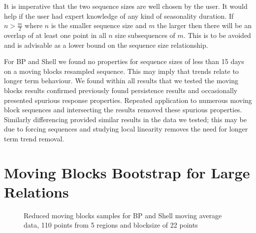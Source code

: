 It is imperative that the two sequence sizes are well chosen by the
user. It would help if the user had expert knowledge of any kind of
seasonality duration. If $n > \frac{m}{2}$ where $n$ is the
smaller sequence size and $m$ the larger then there will be an overlap
of at least one point in all $n$ size subsequences of $m$. This is to
be avoided and is advisable as a lower bound on the sequence size
relationship. 

\smallskip

 For BP and Shell we found no properties for sequence
sizes of less than 15 days on a moving blocks resampled sequence. This
may imply that trends relate to longer term behaviour.
We
found within all results that we tested the moving blocks results
confirmed previously found persistence results and occasionally
presented spurious response properties. Repeated application to
numerous moving block sequences and intersecting the results removed
these spurious properties. Similarly differencing provided similar
results in the data we tested; this may be due to forcing sequences
and studying local linearity removes the need for longer term trend
removal.


\section{Moving Blocks Bootstrap for Large Relations}



\begin{figure}
\begin{minipage}{7cm}
\centerline{}
\caption{\label{graph:bp_11mnfixblock1}{Reduced moving blocks
samples for BP and Shell moving average data, 78 points from 11
regions and blocksize of 7 points}}
\end{minipage}
\hfill
\begin{minipage}{7cm}
\centerline{}
\caption{\label{graph:bp_11mnfixblock2}{Reduced moving blocks
samples for BP and Shell moving average data, 110 points from 5
regions and blocksize of 22 points}}
\end{minipage}
\end{figure}


